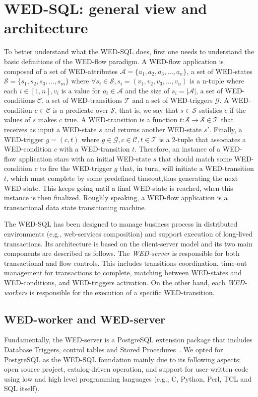 \documentclass[12pt]{article}
\begin{document}
\section{WED-SQL: general view and architecture} 
\label{sec:arch}


To better understand what the WED-SQL does, first one needs to understand the basic definitions of the WED-flow paradigm. 
A WED-flow application is composed of a set of WED-attributes $\mathcal{A} = \{a_1,a_2,a_3,\ldots,a_n\}$, a set of WED-states
$\mathcal{S} = \{s_1,s_2,s_3,\ldots,s_m\}$ where $ \forall s_i \in \mathcal{S}, s_i = (v_1,v_2,v_3,\ldots,v_n)$
is a n-tuple where each $i\in[1,n], v_i$ is a value for $a_i \in \mathcal{A}$ and the size of $s_i = |\mathcal{A}|$, a set of
WED-conditions $\mathcal{C}$, a set of WED-transitions $\mathcal{T}$ and a set of WED-triggers $\mathcal{G}$. A WED-condition
$c \in \mathcal{C}$ is a predicate over $\mathcal{S}$, that is, we say that $s \in \mathcal{S}$ satisfies $c$ if the values
of $s$ makes $c$ true. A WED-transition is a function $t: \mathcal{S}\rightarrow\mathcal{S} \in \mathcal{T}$ that receives 
as input a WED-state $s$ and returns another WED-state $s'$. Finally, a WED-trigger $g = (c,t)$ where $g \in \mathcal{G},
c \in \mathcal{C}, t \in \mathcal{T}$ is a 2-tuple that associates a WED-condition $c$ with a WED-transition $t$. Therefore,
an instance of a WED-flow application stars with an initial WED-state $s$ that should match some WED-condition $c$ to fire
the WED-trigger $g$ that, in turn, will initiate a WED-transition $t$, which must complete by some predefined timeout,thus 
generating the next WED-state. This keeps going until a final WED-state is reached, when this instance is then finalized. 
Roughly speaking, a WED-flow application is a transactional data state transitioning machine.

The WED-SQL has been designed to manage business process in distributed environments (e.g., web-services composition) and support execution of long-lived transactions. Its architecture is based on the client-server model and its two main components are described as follows. The \emph{WED-server} is responsible for both transactional and flow controls. This includes transitions coordination, time-out management for transactions to complete, matching between WED-states and WED-conditions, and WED-triggers activation.  On the other hand, each \emph{WED-workers} is responsible for the execution of a
specific WED-transition. 

\subsection{WED-worker and WED-server}
Fundamentally, the WED-server is a PostgreSQL extension package that includes  Database Triggers, control tables and Stored Procedures~\cite{NAV}. We opted for PostgreSQL as the WED-SQL foundation mainly due to its following aspects: open source project, catalog-driven operation, and support for user-written code using low and high level programming languages (e.g., C, Python, Perl, TCL and SQL itself).
\end{document}
